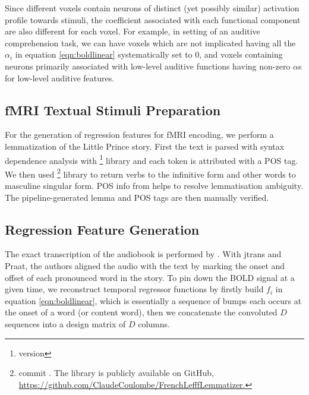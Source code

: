 Since different voxels contain neurons of distinct (yet possibly similar) activation profile towards stimuli, the coefficient associated with each functional component are also different for each voxel. For example, in setting of an auditive comprehension task, we can have voxels which are not implicated having all the \(\alpha_{i}\) in equation \ref{eqn:boldlinear} systematically set to 0, and voxels containing neurons primarily associated with low-level auditive functions having non-zero \(\alpha\)s for low-level auditive features.

\subsection{fMRI Textual Stimuli Preparation} 

For the generation of regression features for fMRI encoding, we perform a lemmatization of the Little Prince story. First the text is parsed with syntax dependence analysis with \footnote{version } library and each token is attributed with a POS tag. We then used \footnote{commit . The library is publicly available on GitHub, \url{https://github.com/ClaudeCoulombe/FrenchLefffLemmatizer.}}\parencite{sagotLefffFreelyAvailable2010} library to return verbs to the infinitive form and other words to masculine singular form. POS info from  helps to resolve lemmatisation ambiguity. The pipeline-generated lemma and POS tags are then manually verified.

\subsection{Regression Feature Generation}
\label{subsec:regressionfeaturegeneration}
The exact transcription of the audiobook is performed by \cite{todorovicAnalysesIRMfLors2018}. With jtrans and Praat, the authors aligned the audio with the text by marking the onset and offset of each pronounced word in the story. To pin down the BOLD signal at a given time, we reconstruct temporal regressor functions by firstly build \(f_{i}\) in equation \ref{eqn:boldlinear}, which is essentially a sequence of bumps each occurs at the onset of a word (or content word), then we concatenate the convoluted \(D\) sequences into a design matrix of \(D\) columns.

